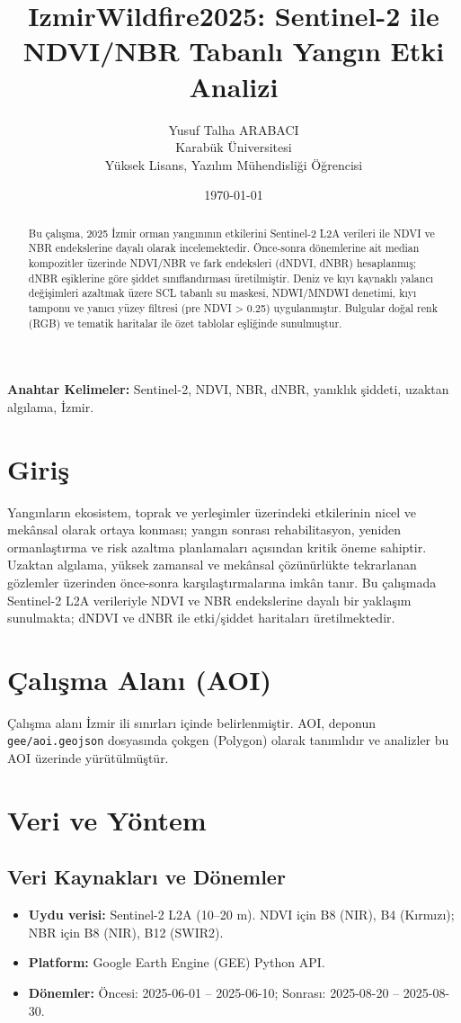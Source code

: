 \documentclass[11pt,a4paper]{article}
\title{IzmirWildfire2025: Sentinel-2 ile NDVI/NBR Tabanlı Yangın Etki Analizi}
\author{Yusuf Talha ARABACI\\Karabük Üniversitesi\\Yüksek Lisans, Yazılım Mühendisliği Öğrencisi}
\date{\today}
\begin{document}
\sloppy
\maketitle
\thispagestyle{empty}

\begin{abstract}
Bu çalışma, 2025 İzmir orman yangınının etkilerini Sentinel-2 L2A verileri ile NDVI ve NBR endekslerine dayalı olarak incelemektedir. Önce-sonra dönemlerine ait median kompozitler üzerinde NDVI/NBR ve fark endeksleri (dNDVI, dNBR) hesaplanmış; dNBR eşiklerine göre şiddet sınıflandırması üretilmiştir. Deniz ve kıyı kaynaklı yalancı değişimleri azaltmak üzere SCL tabanlı su maskesi, NDWI/MNDWI denetimi, kıyı tamponu ve yanıcı yüzey filtresi (pre NDVI > 0.25) uygulanmıştır. Bulgular doğal renk (RGB) ve tematik haritalar ile özet tablolar eşliğinde sunulmuştur.
\end{abstract}

\noindent\textbf{Anahtar Kelimeler:} Sentinel-2, NDVI, NBR, dNBR, yanıklık şiddeti, uzaktan algılama, İzmir.

\tableofcontents
\clearpage

\section{Giriş}
Yangınların ekosistem, toprak ve yerleşimler üzerindeki etkilerinin nicel ve mekânsal olarak ortaya konması; yangın sonrası rehabilitasyon, yeniden ormanlaştırma ve risk azaltma planlamaları açısından kritik öneme sahiptir. Uzaktan algılama, yüksek zamansal ve mekânsal çözünürlükte tekrarlanan gözlemler üzerinden önce-sonra karşılaştırmalarına imkân tanır. Bu çalışmada Sentinel-2 L2A verileriyle NDVI ve NBR endekslerine dayalı bir yaklaşım sunulmakta; dNDVI ve dNBR ile etki/şiddet haritaları üretilmektedir.

\section{Çalışma Alanı (AOI)}
Çalışma alanı İzmir ili sınırları içinde belirlenmiştir. AOI, deponun \texttt{gee/aoi.geojson} dosyasında çokgen (Polygon) olarak tanımlıdır ve analizler bu AOI üzerinde yürütülmüştür.

\section{Veri ve Yöntem}
\subsection{Veri Kaynakları ve Dönemler}
\begin{itemize}
  \item \textbf{Uydu verisi:} Sentinel-2 L2A (10--20 m). NDVI için B8 (NIR), B4 (Kırmızı); NBR için B8 (NIR), B12 (SWIR2).
  \item \textbf{Platform:} Google Earth Engine (GEE) Python API.
  \item \textbf{Dönemler:} Öncesi: 2025-06-01 -- 2025-06-10; Sonrası: 2025-08-20 -- 2025-08-30.
\end{itemize}
\end{document}
